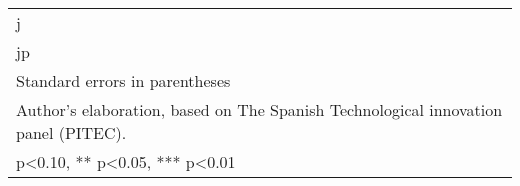 \begin{table}[htbp]
\begin{tabular}{l*{18}{c}}
j                   &               &               &               &               &               &               &               &               &               &               &               &               &               &               &               &               &               &               \\
jp                  &               &               &               &               &               &               &               &               &               &               &               &               &               &               &               &               &               &               \\
\hline\hline
\multicolumn{19}{l}{\footnotesize Standard errors in parentheses}\\
\multicolumn{19}{l}{\footnotesize Author's elaboration, based on The Spanish Technological innovation panel (PITEC).}\\
\multicolumn{19}{l}{\footnotesize * p<0.10, ** p<0.05, *** p<0.01}\\
\end{tabular}
\end{table}
